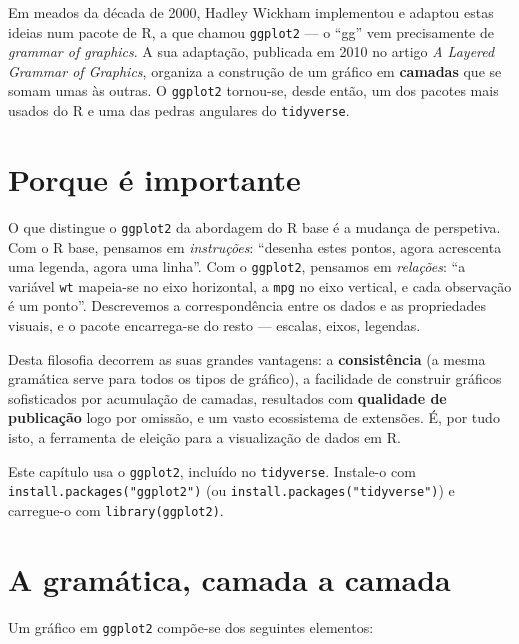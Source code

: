 \documentclass[
  portuguese,
  11pt,
  openany]{book}
\begin{document}
Em meados da década de 2000, Hadley Wickham implementou e adaptou estas ideias num
pacote de R, a que chamou \texttt{ggplot2} --- o ``gg'' vem precisamente de \emph{grammar of graphics}.
A sua adaptação, publicada em 2010 no artigo \emph{A Layered Grammar of Graphics}, organiza a
construção de um gráfico em \textbf{camadas} que se somam umas às outras. O \texttt{ggplot2}
tornou-se, desde então, um dos pacotes mais usados do R e uma das pedras angulares do
\texttt{tidyverse}.

\section{Porque é importante}\label{porque-uxe9-importante}

O que distingue o \texttt{ggplot2} da abordagem do R base é a mudança de perspetiva. Com o R
base, pensamos em \emph{instruções}: ``desenha estes pontos, agora acrescenta uma legenda,
agora uma linha''. Com o \texttt{ggplot2}, pensamos em \emph{relações}: ``a variável \texttt{wt} mapeia-se no
eixo horizontal, a \texttt{mpg} no eixo vertical, e cada observação é um ponto''. Descrevemos a
correspondência entre os dados e as propriedades visuais, e o pacote encarrega-se do
resto --- escalas, eixos, legendas.

Desta filosofia decorrem as suas grandes vantagens: a \textbf{consistência} (a mesma
gramática serve para todos os tipos de gráfico), a facilidade de construir gráficos
sofisticados por acumulação de camadas, resultados com \textbf{qualidade de publicação} logo
por omissão, e um vasto ecossistema de extensões. É, por tudo isto, a ferramenta de
eleição para a visualização de dados em R.

Este capítulo usa o \texttt{ggplot2}, incluído no \texttt{tidyverse}. Instale-o com
\texttt{install.packages("ggplot2")} (ou \texttt{install.packages("tidyverse")}) e carregue-o com
\texttt{library(ggplot2)}.

\section{A gramática, camada a camada}\label{a-gramuxe1tica-camada-a-camada}

Um gráfico em \texttt{ggplot2} compõe-se dos seguintes elementos:
\end{document}
